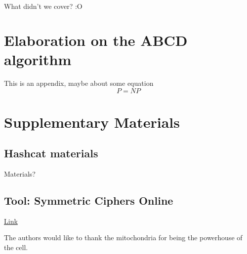 \documentclass[acmlarge]{acmart}
\begin{document}
What didn't we cover? :O

\appendix
\section{Elaboration on the ABCD algorithm}

This is an appendix, maybe about some equation
\begin{displaymath}
P=NP
\end{displaymath}

\section{Supplementary Materials}

\subsection{Hashcat materials}

Materials?

\subsection{Tool: Symmetric Ciphers Online }

\href{http://symmetric-ciphers.online-domain-tools.com/}{Link}

\begin{acks}

The authors would like to thank the mitochondria for being the powerhouse of the cell.

\end{acks}



\end{document}
